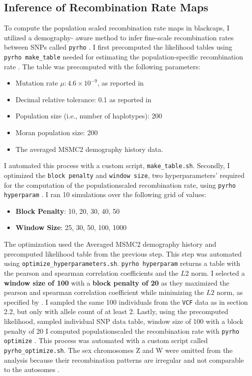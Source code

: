 \documentclass[12pt,a4paper]{article}
\begin{document}
\subsection{Inference of Recombination Rate Maps}
To compute the population scaled recombination rate maps in blackcaps, I
utilized a demography- aware method to infer fine-scale recombination rates
between SNPs called \texttt{pyrho} \parencite{doi:10.1126/sciadv.aaw9206}. I
first precomputed the likelihood tables using \texttt{pyrho make\_table} needed
for estimating the population-specific recombination rate
\parencite{doi:10.1126/sciadv.aaw9206}. The table was precomputed with the
following parameters:
\begin{itemize}[label=--, itemsep=0pt]
	\item Mutation rate $\mu: 4.6\times10^{-9}$, as reported in
	      \cite{bascon-cardozo-fine-scale-2024}
	\item Decimal relative tolerance: 0.1 as reported in
	      \cite{bascon-cardozo-fine-scale-2024}
	\item Population size (i.e., number of haplotypes): 200
	\item Moran population size: 200
	\item The averaged MSMC2 demography history data.
\end{itemize}
I automated this process with a custom script, \texttt{make\_table.sh}. Secondly, I optimized
the \texttt{block penalty} and \texttt{window size}, two hyper\-parameters' required for
the computation of the population\-scaled recombination rate, using \texttt{pyrho hyperparam}
\parencite{doi:10.1126/sciadv.aaw9206}. I ran 10 simulations over the following grid of values:
\begin{itemize}[label=--, itemsep=0pt]
	\item \textbf{Block Penalty}: 10, 20, 30, 40, 50
	\item \textbf{Window Size}: 25, 30, 50, 100, 1000
\end{itemize}
The optimization used the Averaged MSMC2 demography history and precomputed likelihood table
from the previous step. This step was automated using \texttt{optimize\_hyperparameters.sh}.
\texttt{pyrho hyperparam} returns a table with the pearson and spearman correlation coefficients
and the $L2$ norm. I selected a \textbf{window size of 100} with a \textbf{block penalty of 20} as they maximized
the pearson and spearman correlation coefficient while minimizing the $L2$ norm,
as specified by \parencite{doi:10.1126/sciadv.aaw9206}. I sampled the same 100 individuals from
the \texttt{VCF} data as in section 2.2, but only with allele count of at least 2.
Lastly, using the precomputed likelihood, sampled individual SNP data table, window size of 100
with a block penalty of 20 I computed population\-scaled the recombination rate with
\texttt{pyrho optimize} \parencite{doi:10.1126/sciadv.aaw9206}.
This process was automated with a custom script called \texttt{pyrho\_optimize.sh}. The sex
chromosomes Z and W were omitted from the analysis because their recombination patterns are
irregular and not comparable to the autosomes \parencite{pigozzi_chromosomes_2016}.
\end{document}

